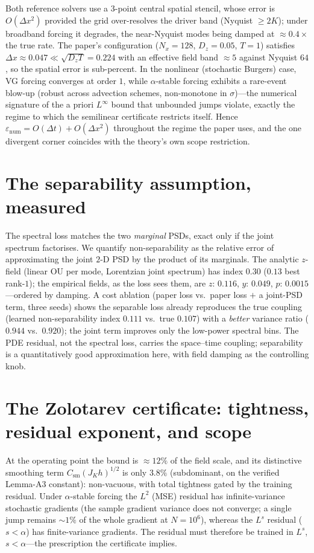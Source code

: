 \documentclass[11pt]{article}
\begin{document}
\noindent
Both reference solvers use a $3$-point central spatial stencil, whose error is
$O(\Delta x^2)$ provided the grid over-resolves the driver band (Nyquist $\ge 2K$); under
broadband forcing it degrades, the near-Nyquist modes being damped at $\approx0.4\times$ the
true rate. The paper's configuration ($N_x=128$, $D_z=0.05$, $T=1$) satisfies
$\Delta x\approx0.047\ll\sqrt{D_zT}=0.224$ with an effective field band $\approx5$ against
Nyquist $64$, so the spatial error is sub-percent. In the nonlinear (stochastic Burgers)
case, VG forcing converges at order $1$, while $\alpha$-stable forcing exhibits a
rare-event blow-up (robust across advection schemes, non-monotone in $\sigma$)---the
numerical signature of the a priori $L^\infty$ bound that unbounded jumps violate, exactly
the regime to which the semilinear certificate restricts itself. Hence
$\varepsilon_{\mathrm{num}}=O(\Delta t)+O(\Delta x^2)$ throughout the regime the paper uses,
and the one divergent corner coincides with the theory's own scope restriction.

\section{The separability assumption, measured}
The spectral loss matches the two \emph{marginal} PSDs, exact only if the joint spectrum
factorises. We quantify non-separability as the relative error of approximating the joint
$2$-D PSD by the product of its marginals. The analytic $z$-field (linear OU per mode,
Lorentzian joint spectrum) has index $0.30$ ($0.13$ best rank-$1$); the empirical fields,
as the loss sees them, are $z\!:\,0.116$, $y\!:\,0.049$, $p\!:\,0.0015$---ordered by
damping. A cost ablation (paper loss vs.\ paper loss $+$ a joint-PSD term, three seeds)
shows the separable loss already reproduces the true coupling (learned non-separability
index $0.111$ vs.\ true $0.107$) with a \emph{better} variance ratio ($0.944$ vs.\ $0.920$);
the joint term improves only the low-power spectral bins. The PDE residual, not the
spectral loss, carries the space--time coupling; separability is a quantitatively good
approximation here, with field damping as the controlling knob.

\section{The Zolotarev certificate: tightness, residual exponent, and scope}
At the operating point the bound is $\approx 12\%$ of the field scale, and its distinctive
smoothing term $C_{\mathrm{sm}}(J_Kh)^{1/2}$ is only $3.8\%$ (subdominant, on the verified
Lemma-A3 constant): non-vacuous, with total tightness gated by the training residual. Under
$\alpha$-stable forcing the $L^2$ (MSE) residual has infinite-variance stochastic gradients
(the sample gradient variance does not converge; a single jump remains $\sim1\%$ of the
whole gradient at $N=10^6$), whereas the $L^s$ residual ($s<\alpha$) has finite-variance
gradients. The residual must therefore be trained in $L^s$, $s<\alpha$---the prescription
the certificate implies.
\end{document}
